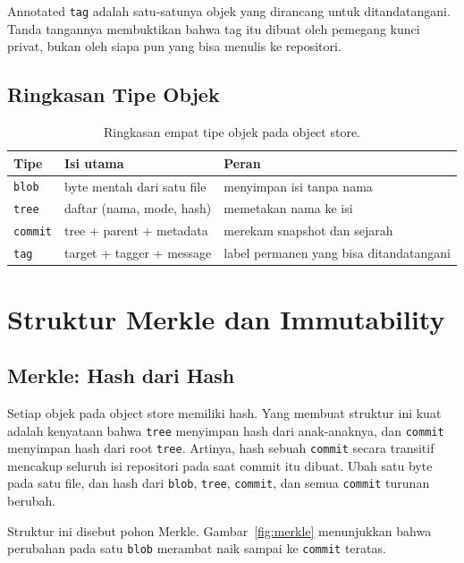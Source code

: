 \documentclass[11pt,a4paper]{article}
\begin{document}
Annotated \texttt{tag} adalah satu-satunya objek yang dirancang untuk ditandatangani. Tanda tangannya membuktikan bahwa tag itu dibuat oleh pemegang kunci privat, bukan oleh siapa pun yang bisa menulis ke repositori.

\subsection{Ringkasan Tipe Objek}

\begin{table}[H]
	\centering
	\caption{Ringkasan empat tipe objek pada object store.}
	\label{tab:object-types}
	\small
	\begin{tabularx}{\textwidth}{l X X}
		\toprule
		Tipe            & Isi utama                  & Peran                                   \\
		\midrule
		\texttt{blob}   & byte mentah dari satu file & menyimpan isi tanpa nama                \\
		\texttt{tree}   & daftar (nama, mode, hash)  & memetakan nama ke isi                   \\
		\texttt{commit} & tree + parent + metadata   & merekam snapshot dan sejarah            \\
		\texttt{tag}    & target + tagger + message  & label permanen yang bisa ditandatangani \\
		\bottomrule
	\end{tabularx}
\end{table}

\section{Struktur Merkle dan Immutability}

\subsection{Merkle: Hash dari Hash}

Setiap objek pada object store memiliki hash. Yang membuat struktur ini kuat adalah kenyataan bahwa \texttt{tree} menyimpan hash dari anak-anaknya, dan \texttt{commit} menyimpan hash dari root \texttt{tree}. Artinya, hash sebuah \texttt{commit} secara transitif mencakup seluruh isi repositori pada saat commit itu dibuat. Ubah satu byte pada satu file, dan hash dari \texttt{blob}, \texttt{tree}, \texttt{commit}, dan semua \texttt{commit} turunan berubah.

Struktur ini disebut pohon Merkle. Gambar~\ref{fig:merkle} menunjukkan bahwa perubahan pada satu \texttt{blob} merambat naik sampai ke \texttt{commit} teratas.
\end{document}
